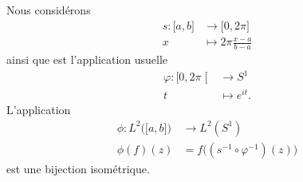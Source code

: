 \begin{proposition}
	Nous considérons
	\begin{equation}
		\begin{aligned}
			s\colon \mathopen[ a , b \mathclose] & \to \mathopen[ 0 , 2\pi \mathclose] \\
			x                                    & \mapsto 2\pi\frac{ x-a }{ b-a }
		\end{aligned}
	\end{equation}
	ainsi que est l'application usuelle
	\begin{equation}
		\begin{aligned}
			\varphi\colon \mathopen[ 0 , 2\pi \mathclose[ & \to S^1          \\
			t                                             & \mapsto  e^{it}.
		\end{aligned}
	\end{equation}
	L'application
	\begin{equation}
		\begin{aligned}
			\phi\colon L^2\big( \mathopen[ a , b \mathclose] \big) & \to L^2(S^1)                                \\
			\phi(f)(z)                                             & =f\big( (s^{-1}\circ \varphi^{-1})(z) \big)
		\end{aligned}
	\end{equation}
	est une bijection isométrique.
\end{proposition}

